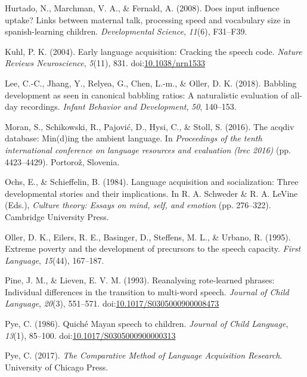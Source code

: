 \documentclass[,man,floatsintext]{apa6}
\begin{document}
\hypertarget{ref-hurtado2008does}{}
Hurtado, N., Marchman, V. A., \& Fernald, A. (2008). Does input
influence uptake? Links between maternal talk, processing speed and
vocabulary size in spanish-learning children. \emph{Developmental
Science}, \emph{11}(6), F31--F39.

\hypertarget{ref-kuhl2004early}{}
Kuhl, P. K. (2004). Early language acquisition: Cracking the speech
code. \emph{Nature Reviews Neuroscience}, \emph{5}(11), 831.
doi:\href{https://doi.org/10.1038/nrn1533}{10.1038/nrn1533}

\hypertarget{ref-lee2018babbling}{}
Lee, C.-C., Jhang, Y., Relyea, G., Chen, L.-m., \& Oller, D. K. (2018).
Babbling development as seen in canonical babbling ratios: A
naturalistic evaluation of all-day recordings. \emph{Infant Behavior and
Development}, \emph{50}, 140--153.

\hypertarget{ref-moran2016acqdiv}{}
Moran, S., Schikowski, R., Pajović, D., Hysi, C., \& Stoll, S. (2016).
The acqdiv database: Min(d)ing the ambient language. In
\emph{Proceedings of the tenth international conference on language
resources and evaluation (lrec 2016)} (pp. 4423--4429). Portorož,
Slovenia.

\hypertarget{ref-ochs1984language}{}
Ochs, E., \& Schieffelin, B. (1984). Language acquisition and
socialization: Three developmental stories and their implications. In R.
A. Schweder \& R. A. LeVine (Eds.), \emph{Culture theory: Essays on
mind, self, and emotion} (pp. 276--322). Cambridge University Press.

\hypertarget{ref-oller1995extreme}{}
Oller, D. K., Eilers, R. E., Basinger, D., Steffens, M. L., \& Urbano,
R. (1995). Extreme poverty and the development of precursors to the
speech capacity. \emph{First Language}, \emph{15}(44), 167--187.

\hypertarget{ref-pine1993reanalysing}{}
Pine, J. M., \& Lieven, E. V. M. (1993). Reanalysing rote-learned
phrases: Individual differences in the transition to multi-word speech.
\emph{Journal of Child Language}, \emph{20}(3), 551--571.
doi:\href{https://doi.org/10.1017/S0305000900008473}{10.1017/S0305000900008473}

\hypertarget{ref-pye1986quiche}{}
Pye, C. (1986). Quiché Mayan speech to children. \emph{Journal of Child
Language}, \emph{13}(1), 85--100.
doi:\href{https://doi.org/10.1017/S0305000900000313}{10.1017/S0305000900000313}

\hypertarget{ref-pye2017comparative}{}
Pye, C. (2017). \emph{The Comparative Method of Language Acquisition
Research}. University of Chicago Press.
\end{document}
